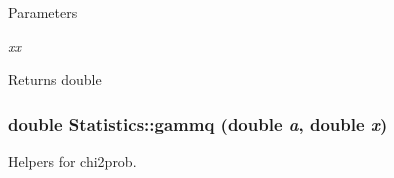 \begin{DoxyParams}{Parameters}
\item[{\em xx}]\end{DoxyParams}
\begin{DoxyReturn}{Returns}
double 
\end{DoxyReturn}
\hypertarget{classStatistics_a2354707a932318f80943bd0a197f0055}{
\subsubsection[{gammq}]{\setlength{\rightskip}{0pt plus 5cm}double Statistics::gammq (double {\em a}, \/  double {\em x})}}
\label{classStatistics_a2354707a932318f80943bd0a197f0055}


Helpers for chi2prob. 

